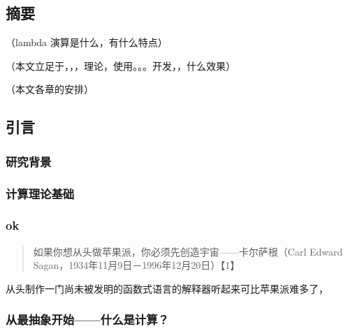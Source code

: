 
\hypertarget{ux6458ux8981}{%
\subsection{摘要}\label{ux6458ux8981}}

（lambda 演算是什么，有什么特点）

（本文立足于，，，理论，使用。。。开发，，什么效果）

（本文各章的安排）

\hypertarget{ux5f15ux8a00}{%
\subsection{引言}\label{ux5f15ux8a00}}

\hypertarget{ux7814ux7a76ux80ccux666f}{%
\subsubsection{研究背景}\label{ux7814ux7a76ux80ccux666f}}

\hypertarget{section}{%
\subsubsection{}\label{section}}

\hypertarget{ux8ba1ux7b97ux7406ux8bbaux57faux7840}{%
\subsubsection{计算理论基础}\label{ux8ba1ux7b97ux7406ux8bbaux57faux7840}}

\hypertarget{ok}{%
\subsubsection{ok}\label{ok}}

\begin{quote}
如果你想从头做苹果派，你必须先创造宇宙------卡尔萨根（Carl Edward
Sagan，1934年11月9日－1996年12月20日）【1】
\end{quote}

从头制作一门尚未被发明的函数式语言的解释器听起来可比苹果派难多了，

\hypertarget{ux4eceux6700ux62bdux8c61ux5f00ux59cbux4ec0ux4e48ux662fux8ba1ux7b97}{%
\subsubsection{从最抽象开始------什么是计算？}\label{ux4eceux6700ux62bdux8c61ux5f00ux59cbux4ec0ux4e48ux662fux8ba1ux7b97}}

